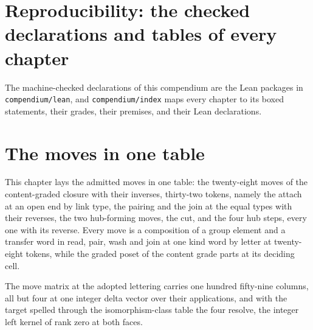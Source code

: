 \section{Reproducibility: the checked declarations and tables of every chapter}\label{app:reproducibility}
The machine-checked declarations of this compendium are the Lean packages in \texttt{compendium/lean}, and \texttt{compendium/index} maps every chapter to its boxed statements, their grades, their premises, and their Lean declarations.
\section{The moves in one table}\label{mod:I-4-moves-in-one-table}
\begin{chwall}\label{box:I-4-moves-in-one-table:1}
This chapter lays the admitted moves in one table: the twenty-eight moves of the content-graded closure with their inverses, thirty-two tokens, namely the attach at an open end by link type, the pairing and the join at the equal types with their reverses, the two hub-forming moves, the cut, and the four hub steps, every one with its reverse. Every move is a composition of a group element and a transfer word in read, pair, wash and join at one kind word by letter at twenty-eight tokens, while the graded poset of the content grade parts at its deciding cell.
\end{chwall}
\begin{chwall}\label{box:I-4-moves-in-one-table:2}
The move matrix at the adopted lettering carries one hundred fifty-nine columns, all but four at one integer delta vector over their applications, and with the target spelled through the isomorphism-class table the four resolve, the integer left kernel of rank zero at both faces.
\end{chwall}

